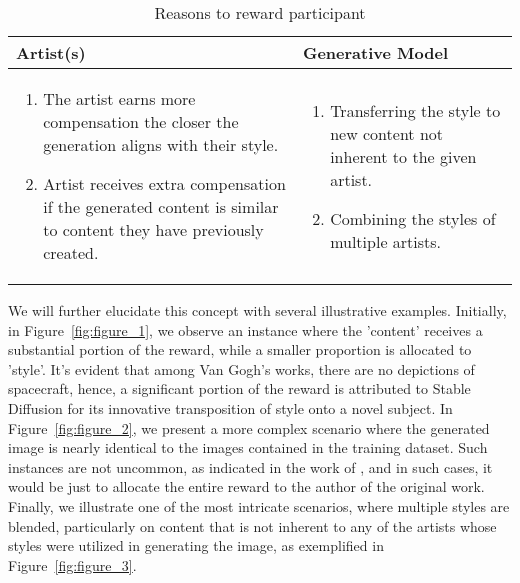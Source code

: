\documentclass[12pt, letterpaper]{article}
\begin{document}
\begin{table}[h!]
    \centering
    \begin{tabular}{|M{0.5\textwidth}|M{0.5\textwidth}|}
        \hline
        \textbf{Artist(s)} & \textbf{Generative Model} \\
        \hline
        \begin{enumerate}[left=0pt]
            \item The artist earns more compensation the closer the generation aligns with their style.
            \item Artist receives extra compensation if the generated content is similar to content they have previously created.
        \end{enumerate} &
        \begin{enumerate}[left=0pt]
            \item Transferring the style to new content not inherent to the given artist.
            \item Combining the styles of multiple artists.
        \end{enumerate} \\
        \hline
    \end{tabular}
    \caption{Reasons to reward participant}
    \label{tab:table_1}
\end{table}

We will further elucidate this concept with several illustrative examples. Initially, in Figure~\ref{fig:figure_1}, we observe an instance where the 'content' receives a substantial portion of the reward, while a smaller proportion is allocated to 'style'. It’s evident that among Van Gogh's works, there are no depictions of spacecraft, hence, a significant portion of the reward is attributed to Stable Diffusion for its innovative transposition of style onto a novel subject. In Figure~\ref{fig:figure_2}, we present a more complex scenario where the generated image is nearly identical to the images contained in the training dataset. Such instances are not uncommon, as indicated in the work of \cite{carlini2023extracting}, and in such cases, it would be just to allocate the entire reward to the author of the original work. Finally, we illustrate one of the most intricate scenarios, where multiple styles are blended, particularly on content that is not inherent to any of the artists whose styles were utilized in generating the image, as exemplified in Figure~\ref{fig:figure_3}.
\end{document}
